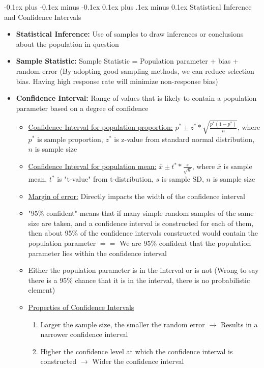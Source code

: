 \documentclass[landscape]{article}
\makeatletter
\renewcommand{\subsection}{\@startsection{subsection}{2}{0mm}%
  {-0.1ex plus -0.1ex minus -0.1ex}%
  {0.1ex plus .1ex minus 0.1ex}%
{\normalfont\scriptsize\bfseries}}
\makeatother
\begin{document}
\begin{multicols*}{5}
    \subsection{Statistical Inference and Confidence Intervals}
    \begin{itemize}
      \item \textbf{Statistical Inference:} Use of samples to draw inferences or conclusions about the population in question
      \item \textbf{Sample Statistic:} Sample Statistic = Population parameter + bias + random error (By adopting good sampling methods, we can reduce selection bias. Having high response rate will minimize non-response bias)
      \item \textbf{Confidence Interval:} Range of values that is likely to contain a population parameter based on a degree of confidence
      \begin{itemize}
        \item \underline{Confidence Interval for population proportion:} $p^* \pm z^* * \sqrt{\frac{p^*(1-p^*)}{n}}$, where $p^*$ is sample proportion, $z^*$ is z-value from standard normal distribution, $n$ is sample size
        \item \underline{Confidence Interval for population mean:} $\overline{x} \pm t^* * \frac{s}{\sqrt{n}}$, where $\overline{x}$ is sample mean, $t^*$ is "t-value" from t-distribution, $s$ is sample SD, $n$ is sample size 
        \item \underline{Margin of error:} Directly impacts the width of the confidence interval
        \item "95\% confident" means that if many simple random samples of the same size are taken, and a confidence interval is constructed for each of them, then about 95\% of the confidence intervals constructed would contain the population parameter $==$ We are 95\% confident that the population parameter lies within the confidence interval
        \item Either the population parameter is in the interval or is not (Wrong to say there is a 95\% chance that it is in the interval, there is no probabilistic element)
        \item \underline{Properties of Confidence Intervals}
        \begin{enumerate}
          \item Larger the sample size, the smaller the random error $\rightarrow$ Results in a narrower confidence interval
          \item Higher the confidence level at which the confidence interval is constructed $\rightarrow$ Wider the confidence interval
        \end{enumerate}
      \end{itemize}
    \end{itemize}


\end{multicols*}
\end{document}
